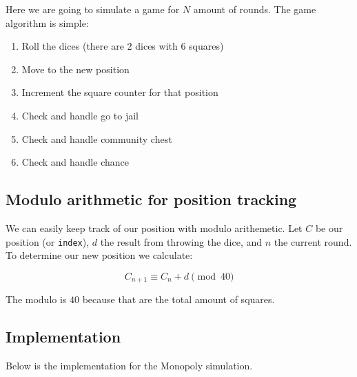 \documentclass[11pt]{article}
\providecommand{\tightlist}{%
      \setlength{\itemsep}{0pt}\setlength{\parskip}{0pt}}
\begin{document}
    Here we are going to simulate a game for \(N\) amount of rounds. The
game algorithm is simple:

\begin{enumerate}
\def\labelenumi{\arabic{enumi}.}
\tightlist
\item
  Roll the dices (there are \(2\) dices with \(6\) squares)
\item
  Move to the new position
\item
  Increment the square counter for that position
\item
  Check and handle go to jail
\item
  Check and handle community chest
\item
  Check and handle chance
\end{enumerate}

    \hypertarget{modulo-arithmetic-for-position-tracking}{%
\subsection{Modulo arithmetic for position
tracking}\label{modulo-arithmetic-for-position-tracking}}

    We can easily keep track of our position with modulo arithemetic. Let
\(C\) be our position (or \texttt{index}), \(d\) the result from
throwing the dice, and \(n\) the current round. To determine our new
position we calculate:

\[ C_{n+1} \equiv C_n+d \pmod{40}\]

    The modulo is \(40\) because that are the total amount of squares.

    \hypertarget{implementation}{%
\subsection{Implementation}\label{implementation}}

    Below is the implementation for the Monopoly simulation.
\end{document}
